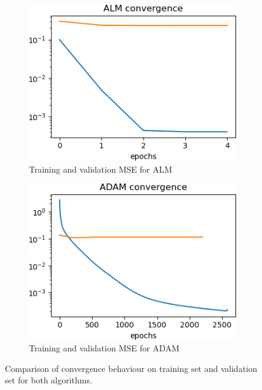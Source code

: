 \begin{figure}[p]
     \centering
     \begin{subfigure}[b]{0.49\textwidth}
         \centering
         \includegraphics[width=\textwidth]{almlaserconv}
         \caption{Training and validation MSE for ALM}
         \label{almlaserconv}
     \end{subfigure}
     \begin{subfigure}[b]{0.49\textwidth}
         \centering
         \includegraphics[width=\textwidth]{adamlaserconv}
         \caption{Training and validation MSE for ADAM}
         \label{adamlaserconv}
     \end{subfigure}
     \caption{Comparison of convergence behaviour on training set and validation set for both algorithms.}
     \label{laserconv}
\end{figure}

